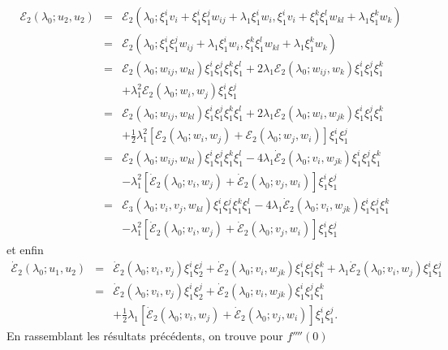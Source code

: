 \documentclass{article}
\begin{document}
\begin{eqnarray*}
  ℰ_2 (λ_0 ; u_2, u_2) & = & ℰ_2 (λ_0 ;
  ξ_1^i v_i + ξ_1^i ξ_1^j w_{i  j} + λ_1 ξ_1^i w_i,
  ξ_1^i v_i + ξ_1^k ξ_1^l w_{k  l} + λ_1 ξ_1^k w_k)\\
  & = & ℰ_2 (λ_0 ; ξ_1^i ξ_1^j w_{i  j} +
  λ_1 ξ_1^i w_i, ξ_1^k ξ_1^l w_{k  l} + λ_1 ξ_1^k
  w_k)\\
  & = & ℰ_2 (λ_0 ; w_{i  j}, w_{k  l})
  ξ_1^i ξ_1^j ξ_1^k ξ_1^l + 2 λ_1 ℰ_2 (λ_0 ;
  w_{i  j}, w_k) ξ_1^i ξ_1^j ξ_1^k\\
  &  &  + λ_1^2 ℰ_2 (λ_0 ; w_i, w_j) ξ_1^i
  ξ_1^j\\
  & = & ℰ_2 (λ_0 ; w_{i  j}, w_{k  l})
  ξ_1^i ξ_1^j ξ_1^k ξ_1^l + 2 λ_1 ℰ_2 (λ_0 ;
  w_i, w_{j  k}) ξ_1^i ξ_1^j ξ_1^k\\
  &  &  + \tfrac{1}{2} λ_1^2  [ℰ_2 (λ_0 ; w_i,
  w_j) +ℰ_2 (λ_0 ; w_j, w_i)] ξ_1^i ξ_1^j\\
  & = & ℰ_2 (λ_0 ; w_{i  j}, w_{k  l})
  ξ_1^i ξ_1^j ξ_1^k ξ_1^l - 4 λ_1  \dot{ℰ}_2
  (λ_0 ; v_i, w_{j  k}) ξ_1^i ξ_1^j ξ_1^k\\
  &  &  - λ_1^2  [\dot{ℰ}_2 (λ_0 ; v_i, w_j) +
  \dot{ℰ}_2 (λ_0 ; v_j, w_i)] ξ_1^i ξ_1^j\\
  & = & ℰ_3 (λ_0 ; v_i, v_j, w_{k  l}) ξ_1^i
  ξ_1^j ξ_1^k ξ_1^l - 4 λ_1  \dot{ℰ}_2 (λ_0 ; v_i,
  w_{j  k}) ξ_1^i ξ_1^j ξ_1^k\\
  &  &  - λ_1^2  [\dot{ℰ}_2 (λ_0 ; v_i, w_j) +
  \dot{ℰ}_2 (λ_0 ; v_j, w_i)] ξ_1^i ξ_1^j
\end{eqnarray*}
et enfin
\begin{eqnarray*}
  \dot{ℰ}_2 (λ_0 ; u_1, u_2) & = & \dot{ℰ}_2
  (λ_0 ; v_i, v_j) ξ_1^i ξ_2^j + \dot{ℰ}_2 (λ_0 ;
  v_i, w_{j  k}) ξ_1^i ξ_1^j ξ_1^k + λ_1
  \dot{ℰ}_2 (λ_0 ; v_i, w_j) ξ_1^i ξ_1^j\\
  & = & \dot{ℰ}_2 (λ_0 ; v_i, v_j) ξ_1^i ξ_2^j +
  \dot{ℰ}_2 (λ_0 ; v_i, w_{j  k}) ξ_1^i ξ_1^j
  ξ_1^k\\
  &  &  + \tfrac{1}{2} λ_1  [\dot{ℰ}_2 (λ_0 ;
  v_i, w_j) + \dot{ℰ}_2 (λ_0 ; v_j, w_i)] ξ_1^i ξ_1^j .
\end{eqnarray*}
En rassemblant les résultats précédents, on trouve pour $f''''
(0)$
\end{document}
